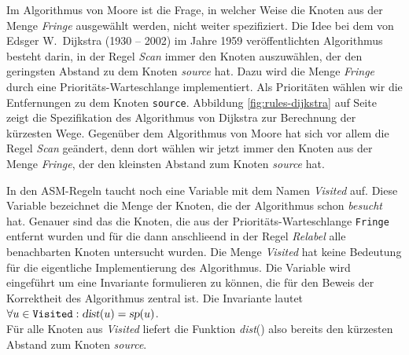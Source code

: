 \noindent
Im Algorithmus von Moore ist die Frage, in welcher Weise die Knoten aus der Menge
\textsl{Fringe} ausgew\"ahlt werden, nicht weiter spezifiziert.  
Die Idee bei dem  von Edsger W.~Dijkstra (1930 -- 2002) im Jahre 1959 ver\"offentlichten
Algorithmus \cite{dijkstra:59}
besteht darin, in der Regel \textsl{Scan} immer den Knoten auszuw\"ahlen, der den geringsten Abstand zu
dem Knoten \textsl{source} hat.
Dazu wird die Menge \textsl{Fringe} durch eine Priorit\"ats-Warteschlange
implementiert.  Als Priorit\"aten w\"ahlen wir die Entfernungen zu dem Knoten \texttt{source}.
Abbildung \ref{fig:rules-dijkstra} auf Seite \pageref{fig:rules-dijkstra} zeigt die 
Spezifikation des Algorithmus von Dijkstra zur Berechnung der k\"urzesten Wege.
Gegen\"uber dem Algorithmus von Moore hat sich vor allem die Regel \textsl{Scan} ge\"andert,
denn dort w\"ahlen wir jetzt immer den Knoten aus der Menge \textsl{Fringe}, der den
kleinsten Abstand zum Knoten \textsl{source} hat.

In den ASM-Regeln taucht noch eine Variable mit dem Namen \textsl{Visited} auf.
Diese Variable bezeichnet die Menge der Knoten, die der Algorithmus schon \textsl{besucht}
hat.  Genauer sind das die Knoten, die aus der Priorit\"ats-Warteschlange \texttt{Fringe}
entfernt wurden und f\"ur die dann anschlie\3end in der Regel \textsl{Relabel} alle
benachbarten Knoten untersucht wurden.  Die Menge \textsl{Visited} hat keine Bedeutung f\"ur
die eigentliche Implementierung des Algorithmus.  Die Variable wird eingef\"uhrt um eine Invariante formulieren
zu k\"onnen, die f\"ur den Beweis der Korrektheit des Algorithmus zentral ist.  Die Invariante lautet
\\[0.2cm]
\hspace*{1.3cm}
$\forall u\in\mathtt{Visited}: \textsl{dist}(u) = \textsl{sp}(u)$.
\\[0.2cm]
F\"ur alle Knoten aus \textsl{Visited} liefert die Funktion \textsl{dist}() also bereits den
k\"urzesten Abstand zum Knoten \textsl{source}.  
\vspace*{0.1cm}

